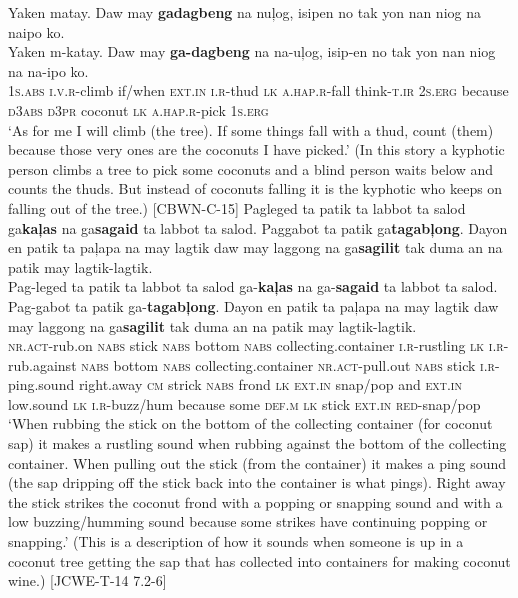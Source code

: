\ea
Yaken  matay.  Daw  may  \textbf{gadagbeng}  na  nuļog,  isipen no tak  yon nan  niog  na  naipo ko. \\\smallskip
\gll Yaken  m-katay.  Daw  may  \textbf{ga-dagbeng}  na  na-uļog,  isip-en no tak  yon nan  niog  na  na-ipo  ko.\\
1\textsc{s.abs}  \textsc{i.v.r}-climb  if/when  \textsc{ext.in}  \textsc{i.r}-thud  \textsc{lk}  \textsc{a.hap.r}-fall  think-\textsc{t.ir} 2\textsc{s.erg} because  \textsc{d3abs} \textsc{d3pr}  coconut  \textsc{lk}  \textsc{a.hap.r}-pick  1\textsc{s.erg} \\
\glt `As for me I will climb (the tree). If some things fall with a thud, count (them) because those very ones are the coconuts I have picked.’ (In this story a kyphotic person climbs a tree to pick some coconuts and a blind person waits below and counts the thuds. But instead of coconuts falling it is the kyphotic who keeps on falling out of the tree.) [CBWN-C-15]
\z 
\ea
Pagleged  ta  patik  ta  labbot  ta  salod  ga\textbf{kaļas} na  ga\textbf{sagaid}   ta  labbot  ta  salod.  Paggabot ta  patik  ga\textbf{tagabļong}.  Dayon  en  patik  ta  paļapa  na  may  lagtik daw  may  laggong  na  ga\textbf{sagilit}    tak    duma  an  na  patik may  lagtik-lagtik. \\\smallskip
\gll Pag-leged  ta  patik  ta  labbot  ta  salod  ga-\textbf{kaļas} na  ga-\textbf{sagaid}   ta  labbot  ta  salod.  Pag-gabot ta  patik  ga-\textbf{tagabļong}.  Dayon  en  patik  ta  paļapa  na  may  lagtik daw  may  laggong  na  ga\textbf{sagilit}    tak    duma  an  na  patik may  lagtik-lagtik. \\
\textsc{nr.act}-rub.on  \textsc{nabs}  stick  \textsc{nabs}  bottom  \textsc{nabs}  collecting.container  \textsc{i.r}-rustling \textsc{lk}  \textsc{i.r}-rub.against  \textsc{nabs}  bottom  \textsc{nabs}  collecting.container  \textsc{nr.act}-pull.out
\textsc{nabs}  stick  \textsc{i.r}-ping.sound  right.away  \textsc{cm}  strick  \textsc{nabs}  frond  \textsc{lk}  \textsc{ext.in}  snap/pop
and  \textsc{ext.in}  low.sound  \textsc{lk}  \textsc{i.r}-buzz/hum  because  some  \textsc{def.m}  \textsc{lk}  stick
\textsc{ext.in}  \textsc{red}-snap/pop \\
\glt `When rubbing the stick on the bottom of the collecting container (for coconut sap) it makes a rustling sound when rubbing against the bottom of the collecting container. When pulling out the stick (from the container) it makes a ping sound (the sap dripping off the stick back into the container is what pings). Right away the stick strikes the coconut frond with a popping or snapping sound and with a low buzzing/humming sound because some strikes have continuing popping or snapping.' (This is a description of how it sounds when someone is up in a coconut tree getting the sap that has collected into containers for making coconut wine.) [JCWE-T-14 7.2-6]
\z


